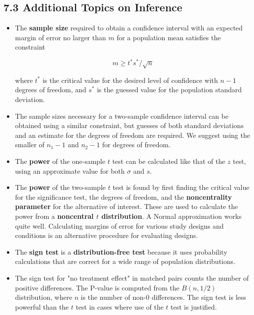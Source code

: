 	\subsection{7.3 Additional Topics on Inference}
		\begin{itemize}
			\item The \textbf{sample size} required to obtain a confidence interval with an expected margin of error no larger than $m$ for a population mean satisfies the constraint
			
			\[m\geq t^{*}s^{*}/\sqrt{n}\]
			
			where $t^{*}$ is the critical value for the desired level of confidence with $n-1$ degrees of freedom, and $s^{*}$ is the guessed value for the population standard deviation.
			
			\item The sample sizes necessary for a two-sample confidence interval can be obtained using a similar constraint, but guesses of both standard deviations and an estimate for the degrees of freedom are required. We suggest using the smaller of $n_1-1$ and $n_2- 1$ for degrees of freedom.
			
			\item The \textbf{power} of the one-sample $t$ test can be calculated like that of the $z$ test, using an approximate value for both $\sigma$ and $s$.
			
			\item The \textbf{power} of the two-sample $t$ test is found by first finding the critical value for the significance test, the degrees of freedom, and the \textbf{noncentrality parameter} for the alternative of interest. These are used to calculate the power from a \textbf{noncentral $t$ distribution}. A Normal approximation works quite well. Calculating margins of error for various study designs and conditions is an alternative procedure for evaluating designs.
			
			\item The \textbf{sign test} is a \textbf{distribution-free test} because it uses probability calculations that are correct for a wide range of population distributions.
			
			\item The sign test for "no treatment effect" in matched pairs counts the number of positive differences. The P-value is computed from the $B(n, 1/2)$ distribution, where $n$ is the number of non-$0$ differences. The sign test is less powerful than the $t$ test in cases where use of the $t$ test is justified.
		\end{itemize}
	